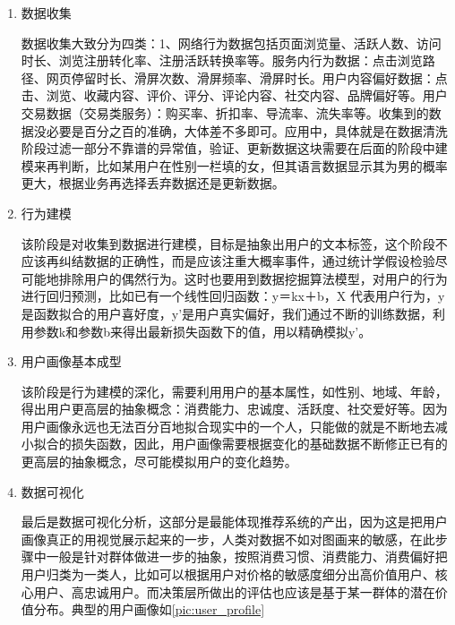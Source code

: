 	    \begin{enumerate}[(1)]
	    \item 数据收集

	    数据收集大致分为四类：1、网络行为数据包括页面浏览量、活跃人数、访问时长、浏览注册转化率、注册活跃转换率等。服务内行为数据：点击浏览路径、网页停留时长、滑屏次数、滑屏频率、滑屏时长。用户内容偏好数据：点击、浏览、收藏内容、评价、评分、评论内容、社交内容、品牌偏好等。用户交易数据（交易类服务）：购买率、折扣率、导流率、流失率等。收集到的数据没必要是百分之百的准确，大体差不多即可。应用中，具体就是在数据清洗阶段过滤一部分不靠谱的异常值，验证、更新数据这块需要在后面的阶段中建模来再判断，比如某用户在性别一栏填的女，但其语言数据显示其为男的概率更大，根据业务再选择丢弃数据还是更新数据。
	    
	    \item 行为建模

	    该阶段是对收集到数据进行建模，目标是抽象出用户的文本标签，这个阶段不应该再纠结数据的正确性，而是应该注重大概率事件，通过统计学假设检验尽可能地排除用户的偶然行为。这时也要用到数据挖掘算法模型，对用户的行为进行回归预测，比如已有一个线性回归函数：y＝kx＋b，X 代表用户行为，y是函数拟合的用户喜好度，y'是用户真实偏好，我们通过不断的训练数据，利用参数k和参数b来得出最新损失函数下的值，用以精确模拟y'。

	    \item 用户画像基本成型

	    该阶段是行为建模的深化，需要利用用户的基本属性，如性别、地域、年龄，得出用户更高层的抽象概念：消费能力、忠诚度、活跃度、社交爱好等。因为用户画像永远也无法百分百地拟合现实中的一个人，只能做的就是不断地去减小拟合的损失函数，因此，用户画像需要根据变化的基础数据不断修正已有的更高层的抽象概念，尽可能模拟用户的变化趋势。

	    \item 数据可视化

	    最后是数据可视化分析，这部分是最能体现推荐系统的产出，因为这是把用户画像真正的用视觉展示起来的一步，人类对数据不如对图画来的敏感，在此步骤中一般是针对群体做进一步的抽象，按照消费习惯、消费能力、消费偏好把用户归类为一类人，比如可以根据用户对价格的敏感度细分出高价值用户、核心用户、高忠诚用户。而决策层所做出的评估也应该是基于某一群体的潜在价值分布。典型的用户画像如\autoref{pic:user_profile}
	    \end{enumerate}
